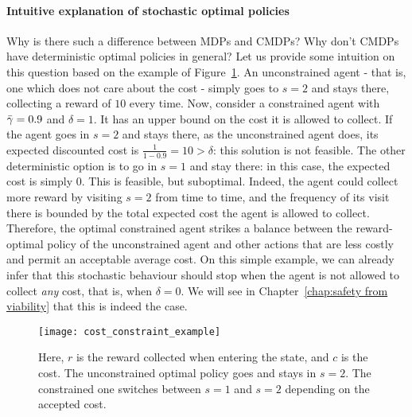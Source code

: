 		\paragraph{Intuitive explanation of stochastic optimal policies} Why is there such a difference between MDPs and CMDPs? Why don't CMDPs have deterministic optimal policies in general? Let us provide some intuition on this question based on the example of Figure~\ref{fig:cmdps stochastic optimal}. An unconstrained agent - that is, one which does not care about the cost - simply goes to $s=2$ and stays there, collecting a reward of $10$ every time. Now, consider a constrained agent with $\bar{\gamma} = 0.9$ and $\delta = 1$. It has an upper bound on the cost it is allowed to collect. If the agent goes in $s=2$ and stays there, as the unconstrained agent does, its expected discounted cost is $\frac{1}{1 - 0.9} = 10 > \delta$: this solution is not feasible. The other deterministic option is to go in $s=1$ and stay there: in this case, the expected cost is simply $0$. This is feasible, but suboptimal. Indeed, the agent could collect more reward by visiting $s=2$ from time to time, and the frequency of its visit there is bounded by the total expected cost the agent is allowed to collect. Therefore, the optimal constrained agent strikes a balance between the reward-optimal policy of the unconstrained agent and other actions that are less costly and permit an acceptable average cost. On this simple example, we can already infer that this stochastic behaviour should stop when the agent is not allowed to collect\emph{ any} cost, that is, when $\delta = 0$. We will see in Chapter~\ref{chap:safety from viability} that this is indeed the case.
		\begin{figure}
			\centering
			\texttt{[image: cost\_constraint\_example]}
			\caption[Constrained MDP example]{Here, $r$ is the reward collected when entering the state, and $c$ is the cost. The unconstrained optimal policy goes and stays in $s=2$. The constrained one switches between $s=1$ and $s=2$ depending on the accepted cost.}
			\label{fig:cmdps stochastic optimal}
		\end{figure} 
		
